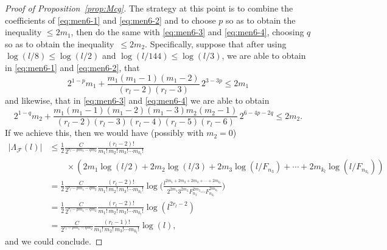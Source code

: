 \documentclass[11pt, a4paper]{article}
\newcommand{\manF}{\Lambda_{\mathcal{F}}}
\theoremstyle{plain}
\theoremstyle{definition}
\begin{document}
\begin{proof}[Proof of Proposition~\ref{prop:Mcg}]
The strategy at this point is to combine the coefficients of \eqref{eq:men6-1} and \eqref{eq:men6-2} and to choose $p$ so as to obtain the inequality $\le 2m_1$, then do the same with \eqref{eq:men6-3} and \eqref{eq:men6-4}, choosing $q$ so as to obtain the inequality~$\le 2m_2$.
Specifically, suppose that after using $\log(l/8) \le \log(l/2)$ and $\log(l/144) \le \log(l/3)$, we are able to obtain in \eqref{eq:men6-1} and \eqref{eq:men6-2}, that
\begin{equation}
\label{eq:pm1}
2^{1-p} m_1 + \frac{m_1(m_1-1)(m_1-2)}{(r_l-2)(r_l-3)} \, 2^{3-3p} \le 2m_1
\end{equation}
and likewise, that in \eqref{eq:men6-3} and \eqref{eq:men6-4} we are able to obtain
\begin{equation}
\label{eq:qm2}
2^{1-q} m_2 + \frac{m_1(m_1-1)(m_1-2)(m_1-3)m_2(m_2-1)}{(r_l-2)(r_l-3)(r_l-4)(r_l-5)(r_l-6)} 
\, 2^{6-4p-2q} \le 2m_2.
\end{equation}
If we achieve this, then we would have (possibly with $m_2=0$)
\begin{align*}
|\manF(l)| &\le
\frac{1}{2} \frac{C}{2^{r_l-pm_1-qm_2}} \frac{(r_l-2)!}{m_1!\,m_2!\,m_3! \cdots m_{k_l}!} \\
&\qquad \times
\left( 2m_1\log(l/2) + 2m_2\log(l/3) + 2m_3\log(l/F_{n_3}) + \cdots + 2m_{k_l}\log(l/F_{n_{k_l}}) \right)
\\
&= \frac{1}{2} \frac{C}{2^{r_l-pm_1-qm_2}} \frac{(r_l-2)!}{m_1!\,m_2!\,m_3! \cdots m_{k_l}!}
\log\bigg( \frac{l^{2m_1+2m_2+2m_3+\cdots+2m_{k_l}}}{2^{2m_1}3^{2m_2}F_{n_3}^{2m_3} 
  \cdots F_{n_{k_l}}^{2m_{k_l}}} \bigg)
\\
&= \frac{1}{2} \frac{C}{2^{r_l-pm_1-qm_2}} \frac{(r_l-2)!}{m_1!\,m_2!\,m_3! \cdots m_{k_l}!}
\log(l^{2r_l-2})
\\
&= \frac{C}{2^{r_l-pm_1-qm_2}} \frac{(r_l-1)!}{m_1!\,m_2!\,m_3! \cdots m_{k_l}!}
\log(l),
\end{align*}
and we could conclude.


\end{proof}
\end{document}
